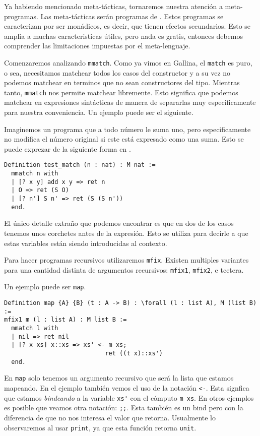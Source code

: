 Ya habiendo mencionado meta-tácticas, tornaremos nuestra atención a meta-programas. Las meta-tácticas serán programas de \Mtac. Estos programas se caracterizan por ser monádicos, es decir, que tienen efectos secundarios. Esto se amplia a muchas caracteristicas útiles, pero nada es gratis, entonces debemos comprender las limitaciones impuestas por el meta-lenguaje.

Comenzaremos analizando \lstinline{mmatch}. Como ya vimos en Gallina, el \lstinline{match} es puro, o sea, necesitamos matchear todos los casos del constructor y a su vez no podemos matchear en terminos que no sean constructores del tipo. Mientras tanto, \lstinline{mmatch} nos permite matchear libremente. Esto significa que podemos matchear en expresiones sintácticas de manera de separarlas muy especificamente para nuestra conveniencia. Un ejemplo puede ser el siguiente.

Imaginemos un programa que a todo número le suma uno, pero especificamente no modifica el número original si este está expresado como una suma. Esto se puede exprezar de la siguiente forma en \Mtac.
\begin{lstlisting}
Definition test_match (n : nat) : M nat :=
  mmatch n with
  | [? x y] add x y => ret n
  | O => ret (S O)
  | [? n'] S n' => ret (S (S n'))
  end.
\end{lstlisting}

El único detalle extraño que podemos encontrar es que en dos de los casos tenemos unos corchetes antes de la expresión. Esto se utiliza para decirle a \Mtac que estas variables están siendo introducidas al contexto.

Para hacer programas recursivos utilizaremos \lstinline{mfix}. Existen multiples variantes para una cantidad distinta de argumentos recursivos: \lstinline{mfix1}, \lstinline{mfix2}, e
tcetera.

Un ejemplo puede ser \lstinline{map}.
\begin{lstlisting}
Definition map {A} {B} (t : A -> B) : \forall (l : list A), M (list B) :=
mfix1 m (l : list A) : M list B :=
  mmatch l with
  | nil => ret nil
  | [? x xs] x::xs => xs' <- m xs;
                            ret ((t x)::xs')
  end.
\end{lstlisting}

En \lstinline{map} solo tenemos un argumento recursivo que será la lista que estamos mapeando.
En el ejemplo también vemos el uso de la notación \lstinline{<-}. Esta signfica que estamos \emph{bindeando} a la variable \lstinline{xs'} con el cómputo \lstinline{m xs}. En otros ejemplos es posible que veamos otra notación: \lstinline{;;}. Esta también es un bind pero con la diferencia de que no nos interesa el valor que retorna. Usualmente lo observaremos al usar \lstinline{print}, ya que esta función retorna \lstinline{unit}.

